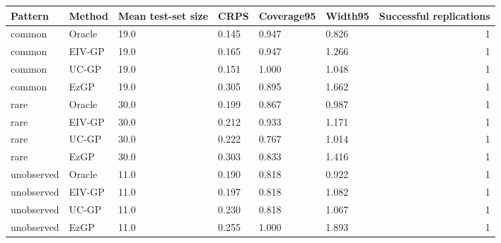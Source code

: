 
\begin{tabular}{llllllr}
\toprule
Pattern & Method & Mean test-set size & CRPS & Coverage95 & Width95 & Successful replications\\
\midrule
common & Oracle & 19.0 & 0.145 & 0.947 & 0.826 & 1\\
common & EIV-GP & 19.0 & 0.165 & 0.947 & 1.266 & 1\\
common & UC-GP & 19.0 & 0.151 & 1.000 & 1.048 & 1\\
common & EzGP & 19.0 & 0.305 & 0.895 & 1.662 & 1\\
rare & Oracle & 30.0 & 0.199 & 0.867 & 0.987 & 1\\
\addlinespace
rare & EIV-GP & 30.0 & 0.212 & 0.933 & 1.171 & 1\\
rare & UC-GP & 30.0 & 0.222 & 0.767 & 1.014 & 1\\
rare & EzGP & 30.0 & 0.303 & 0.833 & 1.416 & 1\\
unobserved & Oracle & 11.0 & 0.190 & 0.818 & 0.922 & 1\\
unobserved & EIV-GP & 11.0 & 0.197 & 0.818 & 1.082 & 1\\
\addlinespace
unobserved & UC-GP & 11.0 & 0.230 & 0.818 & 1.067 & 1\\
unobserved & EzGP & 11.0 & 0.255 & 1.000 & 1.893 & 1\\
\bottomrule
\end{tabular}
